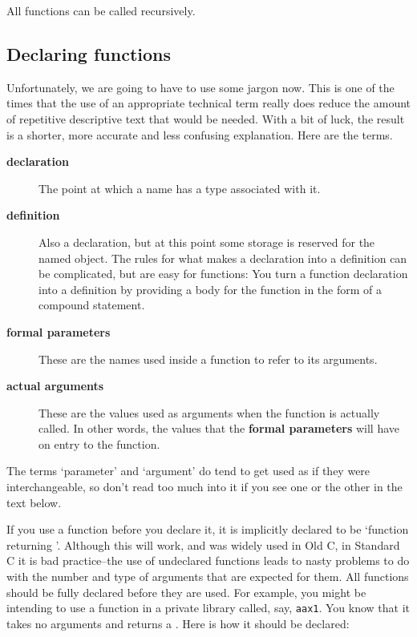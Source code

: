   All functions can be called recursively.


  \subsection{Declaring functions}
   

   Unfortunately, we are going to have to use some jargon now. This is
    one of the times that the use of an appropriate technical term really
    does reduce the amount of repetitive descriptive text that would be
    needed. With a bit of luck, the result is a shorter, more accurate and
    less confusing explanation. Here are the terms.

   \begin{description}
    \item[\textbf{declaration}] The point at which a name has a type associated with it.

    \item[\textbf{definition}] Also a declaration, but at this point some storage is reserved for
     the named object. The rules for what makes a declaration into a
     definition can be complicated, but are easy for functions: You turn a
     function declaration into a definition by providing a body for the
     function in the form of a compound statement.

    \item[\textbf{formal parameters}] These are the names used inside a function to refer to its
     arguments.

    \item[\textbf{actual arguments}] These are the values used as arguments when the function is actually
     called. In other words, the values that the \textbf{formal parameters}
     will have on entry to the function.
   \end{description}
   The terms `parameter' and `argument' do tend to get used
    as if they were interchangeable, so don't read too much into it if you
    see one or the other in the text below.


   If you use a function before you declare it, it is implicitly declared
    to be `function returning \kint{}'. Although this will
    work, and was widely used in Old C, in Standard C it is bad
    practice--the use of undeclared functions leads to nasty problems to
    do with the number and type of arguments that are expected for them. All
    functions should be fully declared before they are used. For example,
    you might be intending to use a function in a private library called,
    say, \texttt{aax1}. You know that it takes no arguments and returns
    a \double. Here is how it should be declared:

